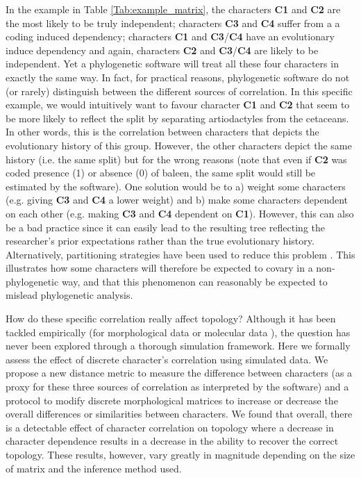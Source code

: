 \documentclass[12pt,letterpaper]{article}
\begin{document}
In the example in Table \ref{Tab:example_matrix}, the characters \textbf{C1} and \textbf{C2} are the most likely to be truly independent; characters \textbf{C3} and \textbf{C4} suffer from a a coding induced dependency; characters \textbf{C1} and \textbf{C3}/\textbf{C4} have an evolutionary induce dependency and again, characters \textbf{C2} and \textbf{C3}/\textbf{C4} are likely to be independent.
Yet a phylogenetic software will treat all these four characters in exactly the same way.
In fact, for practical reasons, phylogenetic software do not (or rarely) distinguish between the different sources of correlation.
In this specific example, we would intuitively want to favour character \textbf{C1} and \textbf{C2} that seem to be more likely to reflect the split by separating artiodactyles from the cetaceans.
In other words, this is the correlation between characters that depicts the evolutionary history of this group.
However, the other characters depict the same history (i.e. the same split) but for the wrong reasons (note that even if \textbf{C2} was coded presence (1) or absence (0) of baleen, the same split would still be estimated by the software).
One solution would be to a) weight some characters (e.g. giving \textbf{C3} and \textbf{C4} a lower weight) and b) make some characters dependent on each other (e.g. making \textbf{C3} and \textbf{C4} dependent on \textbf{C1}).
However, this can also be a bad practice since it can easily lead to the resulting tree reflecting the researcher's prior expectations rather than the true evolutionary history.
Alternatively, partitioning strategies have been used to reduce this problem \citep[see][and references within]{Rosa2019}.
This illustrates how some characters will therefore be expected to covary in a non-phylogenetic way, and that this phenomenon can reasonably be expected to mislead phylogenetic analysis.

How do these specific correlation really affect topology?
Although it has been tackled empirically (for morphological data \citealt{Davalos01072014} or molecular data \citealt{ZouConvergence}), the question has never been explored through a thorough simulation framework.
Here we formally assess the effect of discrete character's correlation using simulated data.
We propose a new distance metric to measure the difference between characters (as a proxy for these three sources of correlation as interpreted by the software) and a protocol to modify discrete morphological matrices to increase or decrease the overall differences or similarities between characters.
We found that overall, there is a detectable effect of character correlation on topology where a decrease in character dependence results in a decrease in the ability to recover the correct topology.
These results, however, vary greatly in magnitude depending on the size of matrix and the inference method used.
\end{document}
